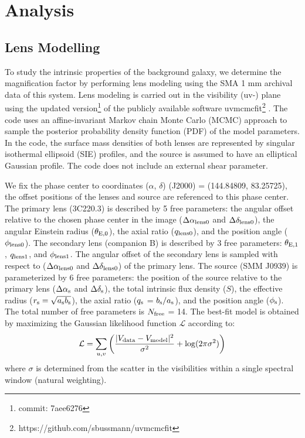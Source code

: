 \documentclass[twocolumn,apj,numberedappendix]{emulateapj}
\begin{document}
\section{Analysis}
\subsection{Lens Modelling} \label{sec:Lens} 
To study the intrinsic properties of the background galaxy, we determine the magnification factor by performing
lens modeling using the SMA 1 mm archival data of this system. Lens modeling is carried out in the visibility
(uv-) plane using the updated version\footnote{commit: 7aee6276} of the publicly available software {\sc uvmcmcfit}\footnote{https://github.com/sbussmann/uvmcmcfit}
\citep{Bussmann15a}. The code uses an affine-invariant Markov chain Monte Carlo (MCMC) approach to sample the posterior
probability density function (PDF) of the model parameters. In the code, the surface mass densities of both
lenses are represented by singular isothermal ellipsoid (SIE) profiles, and the source is assumed to have an
elliptical Gaussian profile. The code does not include an external shear parameter.

We fix the phase center to coordinates ($\alpha$, $\delta$) (J2000) = (144.84809\degr, 83.25725\degr), the
offset positions of the lenses and source are referenced to this phase center. The primary lens (3C220.3) is
described by 5 free parameters: the angular offset relative to
the chosen phase center in the image ($\Delta \alpha_{\rm
lens0}$ and $\Delta \delta_{\rm lens0}$), the angular Einstein radius ($\theta_{\rm E,0}$), the
axial ratio ($q_{\rm lens0}$), and the position angle ($\phi_{\rm lens0}$). The secondary lens (companion B) is
described by 3 free parameters: $\theta_{\rm E,1}$, $q_{\rm lens1}$, and $\phi_{\rm lens1}$. The angular offset
of the secondary
lens is sampled with respect to ($\Delta \alpha_{\rm lens0}$ and $\Delta \delta_{\rm lens0}$) of
the primary lens.
The source (SMM J0939) is parameterized by
6 free parameters: the position of the source relative to the
primary lens ($\Delta \alpha_{\rm s}$ and $\Delta
\delta_{\rm s}$), the total intrinsic flux density ($S$), the
effective radius ($r_{\rm s} = \sqrt{a_{\rm s} b_{\rm s}}$), the axial
ratio ($q_{\rm s}$ =  $b_{\rm s}/a_{\rm s}$), and the position angle
($\phi_{\rm s}$).
The total number of free parameters is $N_{\rm free}$ = 14. The best-fit model is obtained by maximizing the
Gaussian likelihood function $ \mathcal{L} $ according to:
\begin{equation}
    \mathcal{L} = \sum_{u, v}\left( \frac{|V_{\rm data} - V_{\rm
    model}|^2}{\sigma^2} + {\rm log}(2 \pi \sigma^2) \right)
\end{equation}
\noindent where $\sigma$ is determined from the scatter in the visibilities within a
single spectral window (natural weighting).
\end{document}
